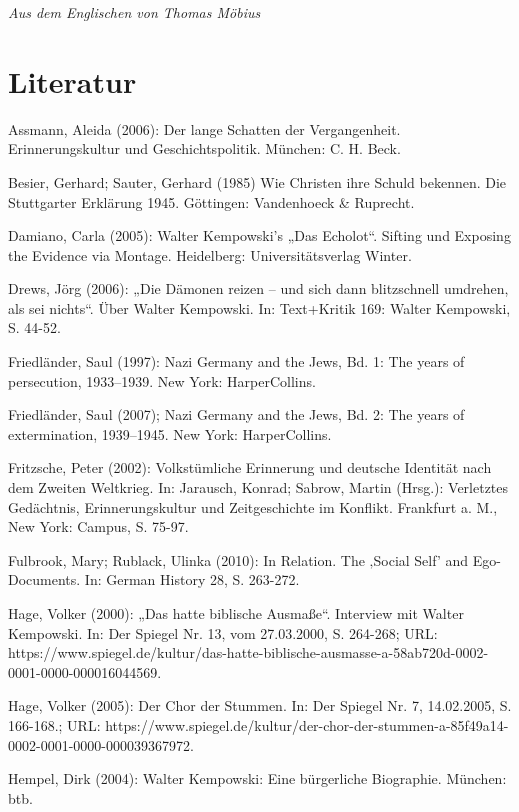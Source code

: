 \begin{multicols*}{2}
\textit{Aus dem Englischen von Thomas Möbius}

\printendnotes[custom]

\section{Literatur}
    \begin{bibdescription}
        \item Assmann, Aleida (2006): Der lange Schatten der Vergangenheit. Erinnerungskultur und Geschichtspolitik. München: C. H. Beck.
        \item Besier, Gerhard; Sauter, Gerhard (1985) Wie Christen ihre Schuld bekennen. Die Stuttgarter Erklärung 1945. Göttingen: Vandenhoeck \& Ruprecht.
        \item Damiano, Carla (2005): Walter Kempowski’s „Das Echolot“. Sifting und Exposing the Evidence via Montage. Heidelberg: Universitätsverlag Winter.
        \item Drews, Jörg (2006): „Die Dämonen reizen – und sich dann blitzschnell umdrehen, als sei nichts“. Über Walter Kempowski. In: Text+Kritik 169: Walter Kempowski, S. 44-52.
        \item Friedländer, Saul (1997): Nazi Germany and the Jews, Bd. 1: The years of persecution, 1933–1939. New York: HarperCollins.
        \item Friedländer, Saul (2007); Nazi Germany and the Jews, Bd. 2: The years of extermination, 1939–1945. New York: HarperCollins. 
        \item Fritzsche, Peter (2002): Volkstümliche Erinnerung und deutsche Identität nach dem Zweiten Weltkrieg. In: Jarausch, Konrad; Sabrow, Martin (Hrsg.): Verletztes Gedächtnis, Erinnerungskultur und Zeitgeschichte im Konflikt. Frankfurt a. M., New York: Campus, S. 75-97.
        \item Fulbrook, Mary; Rublack, Ulinka (2010): In Relation. The ‚Social Self’ and Ego-Documents. In: German History 28, S. 263-272.
        \item Hage, Volker (2000): „Das hatte biblische Ausmaße“. Interview mit Walter Kempowski. In: Der Spiegel Nr. 13, vom 27.03.2000, S. 264-268; URL: https://www.spiegel.de/kultur/das-hatte-biblische-ausmasse-a-58ab720d-0002-0001-0000-000016044569.
        \item Hage, Volker (2005): Der Chor der Stummen. In: Der Spiegel Nr. 7, 14.02.2005, S. 166-168.; URL: https://www.spiegel.de/kultur/der-chor-der-stummen-a-85f49a14-0002-0001-0000-000039367972. 
        \item Hempel, Dirk (2004): Walter Kempowski: Eine bürgerliche Biographie. München: btb.

\end{bibdescription}
\end{multicols*}
